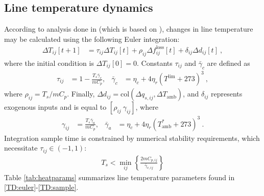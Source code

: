 \documentclass[conference]{IEEEtran}
\begin{document}
\subsection{Line temperature dynamics}\label{sec:temp-dynamics}
According to analysis done in \cite{almassalkhi2014} (which is based on \cite{ieee2007}), changes in line temperature may be calculated using the following Euler integration:
\begin{align}
\label{TD:euler}
\Delta T_{ij}[t+1] &= \tau_{ij}\Delta T_{ij}[t] + \rho_{ij}\Delta f_{ij}^\text{loss}[t] + \delta_{ij}\Delta d_{ij}[t]~,
\end{align}
where the initial condition is $\Delta T_{ij}[0] = 0$. Constants $\tau_{ij}$ and $\bar{\gamma}_c$ are defined as
\begin{align}
\tau_{ij} &= 1 - \frac{T_s\bar{\gamma}_c}{mC_p},& \bar{\gamma}_c &= \eta_c + 4\eta_r(T^\text{lim} + 273)^3~,
\end{align}
where $\rho_{ij} = T_s/mC_p$. Finally, $\Delta d_{ij} = \text{col}(\Delta q_{s,ij},\Delta T_\text{amb})$, and $\delta_{ij}$ represents exogenous inputs and is equal to $[\rho_{ij}~\gamma_{ij}]$, where
\begin{align}
\gamma_{ij} &= \frac{T_s\bar{\gamma}_a}{mC_p}, & \bar{\gamma}_a &= \eta_c + 4\eta_r(T_\text{amb}^* + 273)^3~.
\end{align}
Integration sample time is constrained by numerical stability requirements, which necessitate $\tau_{ij}\in(-1,1)$:
\begin{align}
\label{TD:sample}
T_s < \min_{ij}\left\lbrace \frac{2mC_{p,ij}}{\bar{\gamma}_{c,ij}}\right\rbrace
\end{align}
Table \ref{tab:heatparams} summarizes line temperature parameters found in \eqref{TD:euler}-\eqref{TD:sample}.
\end{document}
